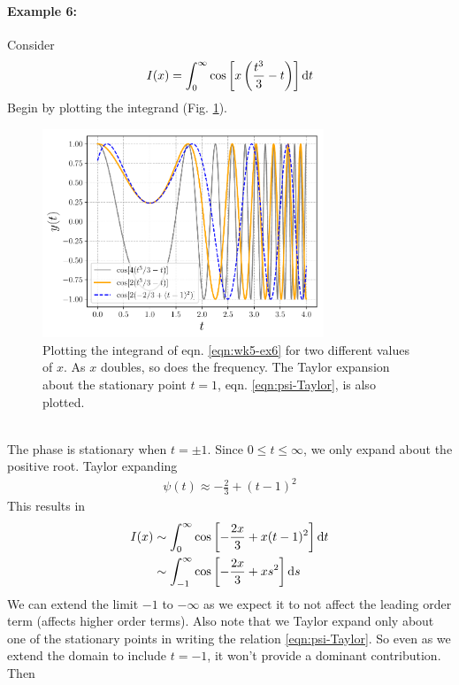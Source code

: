 \paragraph{Example 6:} Consider
\begin{gather}
	I(x) = \int_{0}^{\infty} \cos \left[x\left(\frac{t^3}{3}-t\right)\right] \mathrm{d} t \label{eqn:wk5-ex6}
\end{gather}
Begin by plotting the integrand (Fig. \ref{fig:strogatz-wk05}).
\begin{figure}[h]
	\centering
	\includegraphics[width=0.75\textwidth]{./plots/pdf/strogatz-wk05-cos.pdf}
	\caption{Plotting the integrand of eqn. \ref{eqn:wk5-ex6} for two different values of $x$. As $x$ doubles, so does the frequency. The Taylor expansion about the stationary point $t=1$, eqn. \ref{eqn:psi-Taylor}, is also plotted.}
	\label{fig:strogatz-wk05}
\end{figure}\\
The phase is stationary when $t = \pm 1$. Since $0\leq t \leq \infty$, we only expand about the positive root. Taylor expanding
\begin{gather}\label{eqn:psi-Taylor}
	\psi(t) \approx -\frac{2}{3} + (t-1)^2
\end{gather}
This results in 
\begin{align*}
	I(x) &\sim \int_{0}^{\infty} \cos \left[-\frac{2x}{3} + x(t-1)^2\right] \mathrm{d} t \\
	& \sim \int_{-1}^{\infty}  \cos \left[-\frac{2x}{3} + xs^2\right] \mathrm{d} s
\end{align*}
We can extend the limit $-1$ to $-\infty$ as we expect it to not affect the leading order term (affects higher order terms). Also note that we Taylor expand only about one of the stationary points in writing the relation \ref{eqn:psi-Taylor}. So even as we extend the domain to include $t=-1$, it won't provide a dominant contribution. Then
